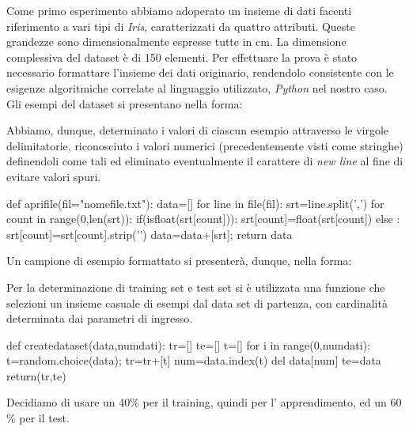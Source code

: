 		Come primo esperimento abbiamo adoperato un insieme di dati facenti riferimento a vari tipi di \emph{Iris}, caratterizzati da quattro attributi.
		Queste grandezze sono dimensionalmente espresse tutte in cm. La dimensione complessiva del dataset è di 150 elementi. Per effettuare la prova è stato necessario formattare l'insieme dei dati originario, rendendolo consistente con le esigenze algoritmiche correlate al linguaggio utilizzato, \emph{Python} nel nostro caso. Gli esempi del dataset si presentano nella forma:
		
		Abbiamo, dunque, determinato i valori di ciascun esempio attraverso le virgole delimitatorie, riconosciuto i valori numerici (precedentemente visti come stringhe) definendoli come tali ed eliminato eventualmente il carattere di \textit{new line} al fine di evitare valori spuri.
		\medskip
		\begin{python}
		def aprifile(fil="nomefile.txt"):
			data=[]
			for line in file(fil):
				srt=line.split(',')
				for count in range(0,len(srt)):
					if(isfloat(srt[count])):
						srt[count]=float(srt[count])
					else :
						srt[count]=srt[count].strip('\n')
				data=data+[srt];
			return data
		\end{python}
		\bigskip
		Un campione di esempio formattato si presenterà, dunque, nella forma:
		
		Per la determinazione di training set e test set si è utilizzata una funzione che selezioni un insieme casuale di esempi dal data set di partenza, con cardinalità determinata dai parametri di ingresso.
		\bigskip
		\begin{python}
		def createdataset(data,numdati):
			tr=[]
			te=[]
			t=[]
			for i in range(0,numdati):
				t=random.choice(data);
				tr=tr+[t]
				num=data.index(t)
				del data[num]
			te=data
			return(tr,te)
		\end{python}
		Decidiamo di usare un 
		40\% per il training, quindi per l' apprendimento, ed un 60 \% per il test.
